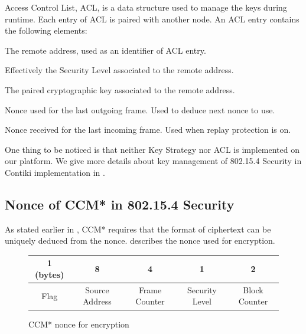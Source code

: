 Access Control List, ACL, is a data structure used to manage the keys during runtime. Each entry of ACL is paired with another node.  An ACL entry contains the following elements:
\begin{description}[style=nextline]
	\item[\textbf{Address}]
	The remote address, used as an identifier of ACL entry.
	\item[\textbf{Security Suite}]
	Effectively the Security Level associated to the remote address.
	\item[\textbf{Key}]
	The paired cryptographic key associated to the remote address.
	\item[\textbf{Last Initial Vector}]
	Nonce used for the last outgoing frame. Used to deduce next nonce to use.
	\item[\textbf{Replay Counter}]
	Nonce received for the last incoming frame. Used when replay protection is on.
\end{description}

One thing to be noticed is that neither Key Strategy nor ACL is implemented on our platform. We give more details about key management of 802.15.4 Security in Contiki implementation in .

\subsection{Nonce of CCM* in 802.15.4 Security}
As stated earlier in , CCM* requires that the format of ciphertext can be uniquely deduced from the nonce.  describes the nonce used for encryption.

\begin{figure}[h!]
	\centering
	\begin{tabular}{|c|c|c|c|c|}
		\hline 
		1 (bytes) & 8              & 4             & 1              & 2             \\ \hline
		Flag      & Source Address & Frame Counter & Security Level & Block Counter \\ \hline
	\end{tabular}
	\caption{CCM* nonce for encryption}
	\label{Fig: CCM nonce}
\end{figure}

